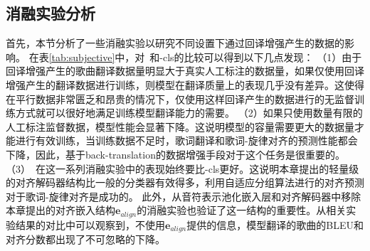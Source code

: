 \subsection{消融实验分析}
首先，本节分析了一些消融实验以研究不同设置下通过回译增强产生的数据的影响。
在表\ref{tab:subjective}中，对\modelname~和\modelname-cls的比较可以得到以下几点发现：
（1）由于回译增强产生的歌曲翻译数据量明显大于真实人工标注的数据量，如果仅使用回译增强产生的翻译数据进行训练，则模型在翻译质量上的表现几乎没有差异。这使得在平行数据非常匮乏和昂贵的情况下，仅使用这样回译产生的数据进行的无监督训练方式就可以很好地满足训练模型翻译能力的需要。
（2）如果只使用数量有限的人工标注监督数据，模型性能会显著下降。这说明模型的容量需要更大的数据量才能进行有效训练，当训练数据不足时，歌词翻译和歌词-旋律对齐的预测性能都会下降，因此，基于back-translation的数据增强手段对于这个任务是很重要的。
（3）\modelname~在这一系列消融实验中的表现始终要比\modelname-cls更好。这说明本章提出的轻量级的对齐解码器结构比一般的分类器有效得多，利用自适应分组算法进行的对齐预测对于歌词-旋律对齐是成功的。
此外，从音符表示池化嵌入层和对齐解码器中移除本章提出的对齐嵌入结构$\mathbf{e}_{align}$的消融实验也验证了这一结构的重要性。从相关实验结果的对比中可以观察到，不使用$\mathbf{e}_{align}$提供的信息，模型翻译的歌曲的BLEU和对齐分数都出现了不可忽略的下降。
